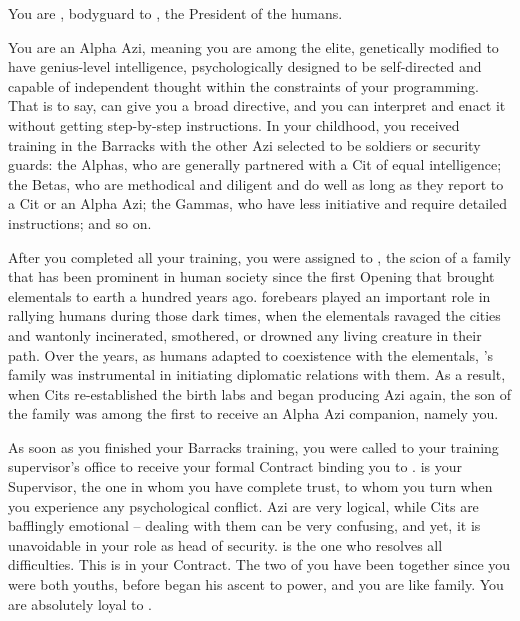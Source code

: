\documentclass[char]{elementals}
\begin{document}
\name{\cRomeo{}}

You are \cRomeo{\intro}, bodyguard to \cLeader{\intro}, the President of the humans.

You are an Alpha Azi, meaning you are among the elite, genetically modified to have genius-level intelligence, psychologically designed to be self-directed and capable of independent thought within the constraints of your programming.  That is to say, \cLeader{} can give you a broad directive, and you can interpret and enact it without getting step-by-step instructions.  In your childhood, you received training in the Barracks with the other Azi selected to be soldiers or security guards: the Alphas, who are generally partnered with a Cit of equal intelligence; the Betas, who are methodical and diligent and do well as long as they report to a Cit or an Alpha Azi; the Gammas, who have less initiative and require detailed instructions; and so on.

After you completed all your training, you were assigned to \cLeader{}, the scion of a family that has been prominent in human society since the first Opening that brought elementals to earth a hundred years ago.  \cLeader{\Their} forebears played an important role in rallying humans during those dark times, when the elementals ravaged the cities and wantonly incinerated, smothered, or drowned any living creature in their path.  Over the years, as humans adapted to coexistence with the elementals, \cLeader{}'s family was instrumental in initiating diplomatic relations with them.  As a result, when Cits re-established the birth labs and began producing Azi again, the son of the \cLeader{\formal} family was among the first to receive an Alpha Azi companion, namely you.

As soon as you finished your Barracks training, you were called to your training supervisor's office to receive your formal Contract binding you to \cLeader{}.  \cLeader{\They} is your Supervisor, the one in whom you have complete trust, to whom you turn when you experience any psychological conflict.  Azi are very logical, while Cits are bafflingly emotional -- dealing with them can be very confusing, and yet, it is unavoidable in your role as head of security.  \cLeader{} is the one who resolves all difficulties.  This is in your Contract.  The two of you have been together since you were both youths, before \cLeader{\they} began his ascent to power, and you are like family.  You are absolutely loyal to \cLeader{\them}.
\end{document}
